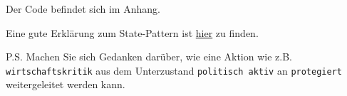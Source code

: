 \documentclass{abgabe}
\begin{document}
\begin{questions}
\begin{parts}
\begin{solution}
            Der Code befindet sich im Anhang.
        \end{solution}
    \end{parts}

    Eine gute Erklärung zum State-Pattern ist \href{https://www.philipphauer.de/study/se/design-pattern/state.php}{hier} zu finden.

    P.S. Machen Sie sich Gedanken darüber, wie eine Aktion wie z.B. \texttt{wirtschaftskritik} aus dem Unterzustand \texttt{politisch aktiv} an \texttt{protegiert} weitergeleitet werden kann.
\end{questions}
\end{document}
